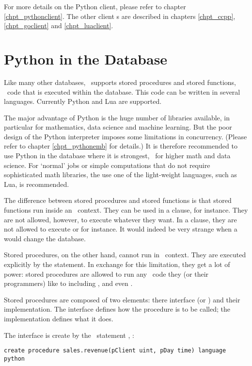 For more details on the Python client,
please refer to chapter \ref{chpt_pythonclient}.
The other client s are described
in chapters \ref{chpt_ccpp}, \ref{chpt_goclient} and
\ref{chpt_luaclient}.

\section{Python in the Database}
Like many other databases,
\nowdb\ supports
stored procedures and stored functions,
\ie\ code that is executed within the database.
This code can be written in several languages.
Currently Python and Lua are supported.

The major advantage of Python is the huge
number of libraries available,
in particular for mathematics,
data science and machine learning.
But the poor design of the Python interpreter
imposes some limitations in concurrency.
(Please refer to chapter \ref{chpt_pythonemb}
for details.)
It is therefore recommended to use Python
in the database where it is strongest,
\ie\ for higher math and data science.
For `normal' 
jobs or simple computations that do not require
sophisticated math libraries, the use one of
the light-weight languages,
such as Lua, is recommended.

The difference between stored procedures
and stored functions is that stored functions
run inside an \sql\ context. They
can be used in a  clause,
for instance. They are not allowed, however,
to execute whatever they want.
In a  clause,
they are not allowed to
execute  or  for instance.
It would indeed be very strange when
a  would change the database.

Stored procedures, on the other hand,
cannot run in \sql\ context. They are
executed explicitly by the 
statement. In exchange for this limitation,
they get a lot of power:
stored procedures are allowed to run
any \sql\ code they (or their programmers)
like to including , 
and even .

Stored procedures are composed of two
elements: there interface (or )
and their implementation.
The interface defines how the procedure is
to be called; the implementation defines
what it does.

The interface is create by the \sql\ statement
, \eg:

\begin{sqlcode}
\begin{lstlisting}
create procedure sales.revenue(pClient uint, pDay time) language python
\end{lstlisting}
\end{sqlcode}

